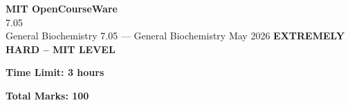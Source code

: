 \documentclass[12pt,a4paper]{exam}
\begin{document}
\begin{center}
{\LARGE \textbf{MIT OpenCourseWare}}\\7.05\\General Biochemistry
\vspace{0.5cm}
{7.05} --- {General Biochemistry}
\vspace{0.3cm}
May 2026
\vspace{0.3cm}
\textbf{EXTREMELY HARD -- MIT LEVEL}
\end{center}

\begin{center}
\textbf{Time Limit: 3 hours}
\end{center}

\begin{center}
\textbf{Total Marks: 100}
\end{center}

\vspace{0.5cm}
\end{document}
